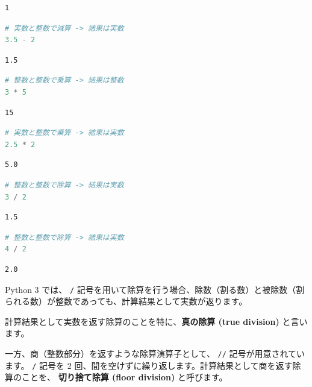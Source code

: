 \begin{lstlisting}[style=outputcell]
1
\end{lstlisting}

\begin{lstlisting}[style=codecell,language=Python]
# 実数と整数で減算 -> 結果は実数
3.5 - 2
\end{lstlisting}

\begin{lstlisting}[style=outputcell]
1.5
\end{lstlisting}

\begin{lstlisting}[style=codecell,language=Python]
# 整数と整数で乗算 -> 結果は整数
3 * 5
\end{lstlisting}

\begin{lstlisting}[style=outputcell]
15
\end{lstlisting}

\begin{lstlisting}[style=codecell,language=Python]
# 実数と整数で乗算 -> 結果は実数
2.5 * 2
\end{lstlisting}

\begin{lstlisting}[style=outputcell]
5.0
\end{lstlisting}

\begin{lstlisting}[style=codecell,language=Python]
# 整数と整数で除算 -> 結果は実数
3 / 2
\end{lstlisting}

\begin{lstlisting}[style=outputcell]
1.5
\end{lstlisting}

\begin{lstlisting}[style=codecell,language=Python]
# 整数と整数で除算 -> 結果は実数
4 / 2
\end{lstlisting}

\begin{lstlisting}[style=outputcell]
2.0
\end{lstlisting}

Python 3 では、 \texttt{/} 記号を用いて除算を行う場合、除数（割る数）と被除数（割られる数）が整数であっても、計算結果として実数が返ります。

計算結果として実数を返す除算のことを特に、\textbf{真の除算 (true division)} と言います。

一方、商（整数部分）を返すような除算演算子として、 \texttt{//} 記号が用意されています。 \texttt{/} 記号を 2 回、間を空けずに繰り返します。計算結果として商を返す除算のことを、 \textbf{切り捨て除算 (floor division)} と呼びます。

